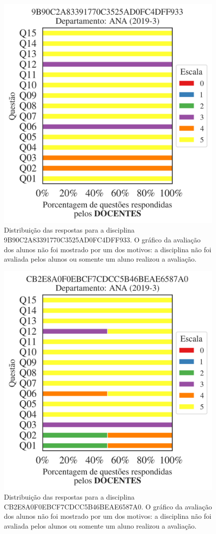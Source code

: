 \documentclass[a4paper,10pt]{article}
\begin{document}
\begin{figure}[h]
\centering
\includegraphics[width=0.485\linewidth]{analise_disciplina_departamento_ANA_9B90C2A83391770C3525AD0FC4DFF933_docentes.png}
\caption{\label{fig:analise_geral_departamento}                Distribuição das respostas para a disciplina 9B90C2A83391770C3525AD0FC4DFF933. O gráfico da avaliação dos alunos não foi mostrado  por um dos motivos:  a disciplina não foi avaliada pelos alunos ou somente um aluno realizou a avaliação. }
\end{figure}
\begin{figure}[h]
\centering
\includegraphics[width=0.485\linewidth]{analise_disciplina_departamento_ANA_CB2E8A0F0EBCF7CDCC5B46BEAE6587A0_docentes.png}
\caption{\label{fig:analise_geral_departamento}                Distribuição das respostas para a disciplina CB2E8A0F0EBCF7CDCC5B46BEAE6587A0. O gráfico da avaliação dos alunos não foi mostrado  por um dos motivos:  a disciplina não foi avaliada pelos alunos ou somente um aluno realizou a avaliação. }
\end{figure}
\end{document}
